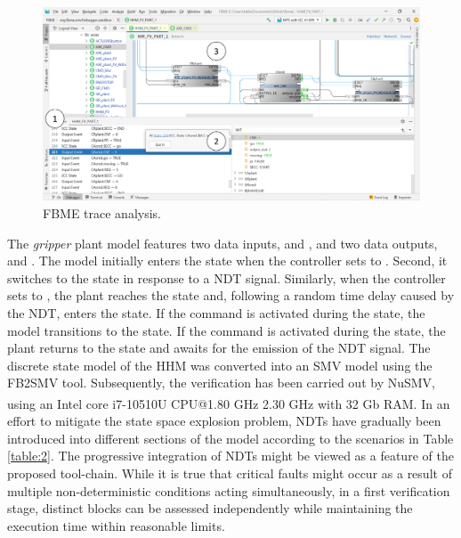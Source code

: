 \begin{bibunit}
\begin{figure}
    \centering
    \includegraphics[scale=0.5]{MX_Papers/Paper4/pictures/lilli11.png}
    \caption{FBME trace analysis.} 
    \label{fig:fbme}
\end{figure}

\noindent The \textit{gripper} plant model features two data inputs,  and , and two data outputs,  and . 
The model initially enters the  state when the controller sets  to . Second, it switches to the  state in response to a NDT signal.
Similarly, when the controller sets  to , the plant reaches the  state and, following a random time delay caused by the NDT, enters the  state.
If the  command is activated during the  state, the model transitions to the  state. If the  command is activated during the  state, the plant returns to the  state and awaits for the emission of the NDT signal.
The discrete state model of the HHM was converted into an SMV model using the FB2SMV tool. Subsequently, the verification has been carried out by NuSMV, using an Intel\textsuperscript{\textregistered} core\textsuperscript{\texttrademark} \mbox{i7-10510U} CPU@1.80 GHz 2.30 GHz with 32 Gb RAM. 
In an effort to mitigate the state space explosion problem, NDTs have gradually been introduced into different sections of the model according to the scenarios in Table \ref{table:2}.
The progressive integration of NDTs might be viewed as a feature of the proposed tool-chain.
While it is true that critical faults might occur as a result of multiple non-deterministic conditions acting simultaneously, in a first verification stage, distinct blocks can be assessed independently while maintaining the execution time within reasonable limits. 


\end{bibunit}
